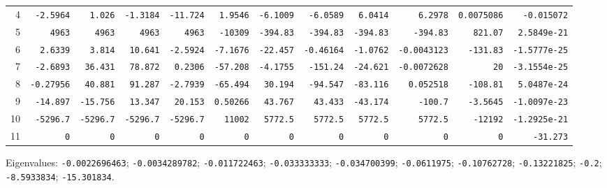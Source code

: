 \begin{landscape}
\begin{tabular}{rrrrrrrrrrrr}
4 & \texttt{-2.5964} & \texttt{1.026} & \texttt{-1.3184} & \texttt{-11.724} & \texttt{1.9546} & \texttt{-6.1009} & \texttt{-6.0589} & \texttt{6.0414} & \texttt{6.2978} & \texttt{0.0075086} & \texttt{-0.015072} \\

5 & \texttt{4963} & \texttt{4963} & \texttt{4963} & \texttt{4963} & \texttt{-10309} & \texttt{-394.83} & \texttt{-394.83} & \texttt{-394.83} & \texttt{-394.83} & \texttt{821.07} & \texttt{2.5849e-21} \\

6 & \texttt{2.6339} & \texttt{3.814} & \texttt{10.641} & \texttt{-2.5924} & \texttt{-7.1676} & \texttt{-22.457} & \texttt{-0.46164} & \texttt{-1.0762} & \texttt{-0.0043123} & \texttt{-131.83} & \texttt{-1.5777e-25} \\

7 & \texttt{-2.6893} & \texttt{36.431} & \texttt{78.872} & \texttt{0.2306} & \texttt{-57.208} & \texttt{-4.1755} & \texttt{-151.24} & \texttt{-24.621} & \texttt{-0.0072628} & \texttt{20} & \texttt{-3.1554e-25} \\

8 & \texttt{-0.27956} & \texttt{40.881} & \texttt{91.287} & \texttt{-2.7939} & \texttt{-65.494} & \texttt{30.194} & \texttt{-94.547} & \texttt{-83.116} & \texttt{0.052518} & \texttt{-108.81} & \texttt{5.0487e-24} \\

9 & \texttt{-14.897} & \texttt{-15.756} & \texttt{13.347} & \texttt{20.153} & \texttt{0.50266} & \texttt{43.767} & \texttt{43.433} & \texttt{-43.174} & \texttt{-100.7} & \texttt{-3.5645} & \texttt{-1.0097e-23} \\

10 & \texttt{-5296.7} & \texttt{-5296.7} & \texttt{-5296.7} & \texttt{-5296.7} & \texttt{11002} & \texttt{5772.5} & \texttt{5772.5} & \texttt{5772.5} & \texttt{5772.5} & \texttt{-12192} & \texttt{-1.2925e-21} \\

11 & \texttt{0} & \texttt{0} & \texttt{0} & \texttt{0} & \texttt{0} & \texttt{0} & \texttt{0} & \texttt{0} & \texttt{0} & \texttt{0} & \texttt{-31.273} \\

\bottomrule\end{tabular}\par\endgroup

{\scriptsize Eigenvalues: \texttt{-0.0022696463}; \texttt{-0.0034289782}; \texttt{-0.011722463}; \texttt{-0.033333333}; \texttt{-0.034700399}; \texttt{-0.0611975}; \texttt{-0.10762728}; \texttt{-0.13221825}; \texttt{-0.2}; \texttt{-8.5933834}; \texttt{-15.301834}.\par}


\end{landscape}
